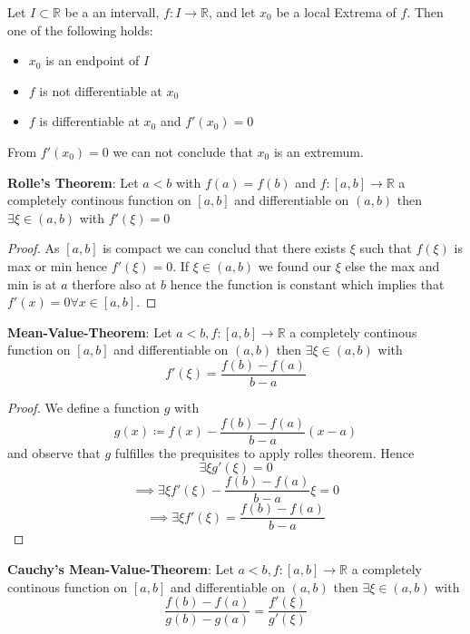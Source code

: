 \begin{theorem}
    Let $I \subset \mathbb{R}$ be a an intervall, $f: I \to \mathbb{R}$, and let $x_0$ be a local Extrema of $f$. Then one of the following holds:
    \begin{itemize}
        \item $x_0$ is an endpoint of $I$
        \item $f$ is not differentiable at $x_0$
        \item $f$ is differentiable at $x_0$ and $f'(x_0) = 0$
    \end{itemize}
\end{theorem}

\begin{remark}
    From $f'(x_0) = 0$ we can not conclude that $x_0$ is an extremum.
\end{remark}

\begin{theorem}
    \textbf{Rolle's Theorem}: Let $a \lt b$ with $f(a) = f(b)$ and $f:[a, b] \to \mathbb{R}$ a completely continous function on $[a, b]$ and differentiable on $(a, b)$ then $\exists \xi \in (a, b)$ with $f'(\xi) = 0$
\end{theorem}

\begin{proof}
    As $[a,b]$ is compact we can conclud that there exists $\xi$ such that $f(\xi)$ is max or min hence $f'(\xi)=0$. If $\xi \in (a,b)$ we found our $\xi$ else the max and min is at $a$ therfore also at $b$ hence the function is constant which implies that $f'(x) = 0 \forall x \in [a,b]$.
\end{proof}

\begin{theorem}
    \textbf{Mean-Value-Theorem}: Let $a \lt b, f:[a, b] \to \mathbb{R}$ a completely continous function on $[a, b]$ and differentiable on $(a, b)$ then $\exists \xi \in (a, b)$ with
    $$f'(\xi) = \frac{f(b)-f(a)}{b-a}$$
\end{theorem}

\begin{proof}
    We define a function $g$ with 
    $$g(x) \coloneqq f(x) - \frac{f(b)-f(a)}{b-a} (x-a)$$
    and observe that $g$ fulfilles the prequisites to apply rolles theorem. Hence 
    $$\exists \xi g'(\xi) = 0$$
    $$\implies \exists \xi f'(\xi) - \frac{f(b)-f(a)}{b-a}\xi  = 0$$
    $$\implies \exists \xi f'(\xi) = \frac{f(b)-f(a)}{b-a}$$
\end{proof}

\begin{theorem}
    \textbf{Cauchy's Mean-Value-Theorem}: Let $a \lt b, f:[a, b] \to \mathbb{R}$ a completely continous function on $[a, b]$ and differentiable on $(a, b)$ then $\exists \xi \in (a, b)$ with
    $$\frac{f(b)-f(a)}{g(b)-g(a)} = \frac{f'(\xi)}{g'(\xi)}$$
\end{theorem}

